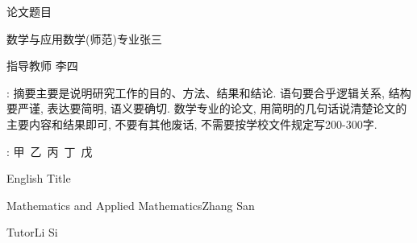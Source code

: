 \documentclass[UTF8,oneside,12pt]{article}  %
\newcommand{\sanhao}{\fontsize{15.75pt}{\baselineskip}\selectfont}
\newcommand{\wuhao}{\fontsize{10.5pt}{\baselineskip}\selectfont}
\theoremstyle{DingLi1}
\numberwithin{equation}{section}
\theoremstyle{DingLi2}
\begin{document}
\def\theTitle{论文题目}             %
\def\theEngTitle{English Title} %
\def\theMajor{数学与应用数学(师范)专业}      %
\def\theEnMajor{Mathematics and Applied Mathematics}  %
\def\theInstitution{数学科学学院}    %
\def\theNo{2015100013}  %
\def\theAuthor{张三}   %
\def\theEnName{Zhang San}  %
\def\theTutor{李四}    %
\def\theEnTutor{Li Si}  %
\def\theProTitle{讲师}  %

\def\theDate{2019年5月15日} %



\vskip 2cm

\tableofcontents
\thispagestyle{empty}
\newpage

\pagestyle{plain}
\setcounter{page}{1}


\vskip 2cm
\begin{center}
\sanhao \heiti \theTitle
\end{center}
\setlength{\parskip}{1ex plus 0.5ex minus 0.2ex}
{\fangsong
\begin{center}
\theMajor  \quad \theAuthor
\end{center}
\begin{center}
指导教师  \quad \theTutor
\end{center}
}
{\wuhao
{} %

:
摘要主要是说明研究工作的目的、方法、结果和结论.  语句要合乎逻辑关系, 结构要严谨, 表达要简明, 语义要确切. 数学专业的论文, 用简明的几句话说清楚论文的主要内容和结果即可, 不要有其他废话, 不需要按学校文件规定写200-300字.


:
 甲\   乙\   丙\  丁\   戊
}


\begin{center}
{\sanhao\theEngTitle}
\end{center}
\begin{center}
\theEnMajor \quad\quad\theEnName
\end{center}
\begin{center}
Tutor\quad\quad\theEnTutor
\end{center}
\end{document}
